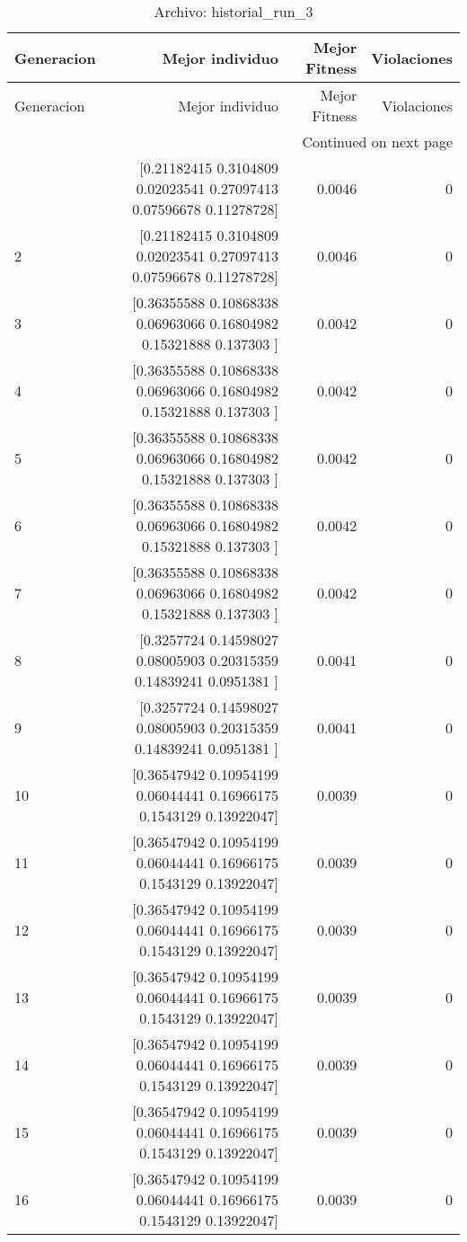 \begin{longtable}{lrrr}
\caption{Archivo: historial\_run\_3}\label{tab:historial_run_3} \\
\toprule
Generacion & Mejor individuo & Mejor Fitness & Violaciones \\
\midrule
\endfirsthead
\toprule
Generacion & Mejor individuo & Mejor Fitness & Violaciones \\
\midrule
\endhead
\midrule
\multicolumn{4}{r}{Continued on next page} \\
\midrule
\endfoot
\bottomrule
\endlastfoot
1 & [0.21182415 0.3104809  0.02023541 0.27097413 0.07596678 0.11278728] & 0.0046 & 0 \\
2 & [0.21182415 0.3104809  0.02023541 0.27097413 0.07596678 0.11278728] & 0.0046 & 0 \\
3 & [0.36355588 0.10868338 0.06963066 0.16804982 0.15321888 0.137303  ] & 0.0042 & 0 \\
4 & [0.36355588 0.10868338 0.06963066 0.16804982 0.15321888 0.137303  ] & 0.0042 & 0 \\
5 & [0.36355588 0.10868338 0.06963066 0.16804982 0.15321888 0.137303  ] & 0.0042 & 0 \\
6 & [0.36355588 0.10868338 0.06963066 0.16804982 0.15321888 0.137303  ] & 0.0042 & 0 \\
7 & [0.36355588 0.10868338 0.06963066 0.16804982 0.15321888 0.137303  ] & 0.0042 & 0 \\
8 & [0.3257724  0.14598027 0.08005903 0.20315359 0.14839241 0.0951381 ] & 0.0041 & 0 \\
9 & [0.3257724  0.14598027 0.08005903 0.20315359 0.14839241 0.0951381 ] & 0.0041 & 0 \\
10 & [0.36547942 0.10954199 0.06044441 0.16966175 0.1543129  0.13922047] & 0.0039 & 0 \\
11 & [0.36547942 0.10954199 0.06044441 0.16966175 0.1543129  0.13922047] & 0.0039 & 0 \\
12 & [0.36547942 0.10954199 0.06044441 0.16966175 0.1543129  0.13922047] & 0.0039 & 0 \\
13 & [0.36547942 0.10954199 0.06044441 0.16966175 0.1543129  0.13922047] & 0.0039 & 0 \\
14 & [0.36547942 0.10954199 0.06044441 0.16966175 0.1543129  0.13922047] & 0.0039 & 0 \\
15 & [0.36547942 0.10954199 0.06044441 0.16966175 0.1543129  0.13922047] & 0.0039 & 0 \\
16 & [0.36547942 0.10954199 0.06044441 0.16966175 0.1543129  0.13922047] & 0.0039 & 0 \\

\end{longtable}
